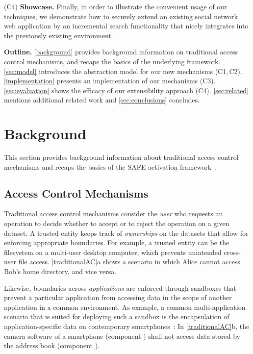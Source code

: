 \documentclass{src/acm_proc_article-sp} \else
\newcommand\myparagraph[1]{\medskip\noindent\textbf{#1.}}
\newcommand\SAFE{SAFE\xspace}
\begin{document}
(C4) \textbf{Showcase.} Finally, in order to illustrate the
convenient usage of our techniques, we demonstrate how to securely
extend an existing social network web application by an incremental
search functionality that nicely integrates into the previously
existing environment.







\myparagraph{Outline} \autoref{background} provides
background information on traditional access control
mechanisms, and recaps the basics of the underlying
framework. \autoref{sec:model} introduces the abstraction
model for our new mechanisms (C1,\,C2).
\autoref{implementation} presents an implementation of our
mechanisms (C3). \autoref{sec:evaluation} shows the efficacy
of our extensibility approach (C4). \autoref{sec:related}
mentions additional related work and
\autoref{sec:conclusions} concludes.
   \section{Background}
\label{background}

This section provides background information about
traditional access control mechanisms and recaps the basics
of the \SAFE activation framework~\cite{Reischuk12:SAFE}.

\subsection{Access Control Mechanisms}

Traditional access control mechanisms consider the \emph{user} who
requests an operation to decide whether to accept or to reject the
operation on a given dataset. A trusted entity keeps track of
\emph{ownerships} on the datasets that allow for enforcing
appropriate boundaries.
For example, a trusted entity can be the filesystem on a
multi-user desktop computer, which prevents unintended
cross-user file access. \autoref{traditionalAC}a shows a
scenario in which Alice cannot access Bob's home directory,
and vice versa.

Likewise, boundaries across \emph{applications} are
enforced through sandboxes that prevent a particular
application from accessing data in the scope of another
application in a common environment.
As example, a common multi-application scenario that is
suited for deploying such a sandbox is the encapsulation
of application-specific data on contemporary smartphones~\cite{Android}:
In \autoref{traditionalAC}b, the camera software of a
smartphone (component ) shall not access data stored
by the address book (component ).
\end{document}
